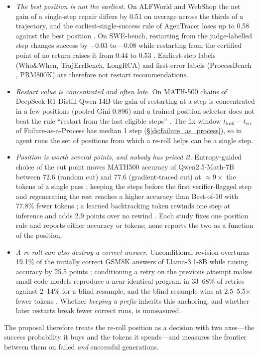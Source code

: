 \begin{itemize}[leftmargin=1.1em]
\item \emph{The best position is not the earliest.} On ALFWorld and WebShop the net gain of a single-step repair differs by 0.51 on average across the thirds of a trajectory, and the earliest-single-success rule of AgenTracer loses up to 0.58 against the best position \cite{liao2026repairs}. On SWE-bench, restarting from the judge-labelled step changes success by $-0.03$ to $-0.08$ while restarting from the certified point of no return raises it from 0.44 to 0.53 \cite{shen2026epv}. Earliest-step labels (Who\&When, TrajErrBench, LongRCA) and first-error labels (ProcessBench \cite{zheng2024processbench}, PRM800K) are therefore not restart recommendations.
\item \emph{Restart value is concentrated and often late.} On MATH-500 chains of DeepSeek-R1-Distill-Qwen-14B the gain of restarting at a step is concentrated in a few positions (pooled Gini 0.896) and a trained position selector does not beat the rule ``restart from the last eligible steps'' \cite{atri2026expanding}. The fix window $t_{\mathrm{lock}}-t_{\mathrm{err}}$ of Failure-as-a-Process has median 1 step (\S\ref{ds:failure_as_process}), so in agent runs the set of positions from which a re-roll helps can be a single step.
\item \emph{Position is worth several points, and nobody has priced it.} Entropy-guided choice of the cut point moves MATH500 accuracy of Qwen2.5-Math-7B between 72.6 (random cut) and 77.6 (gradient-traced cut) at $\approx9\times$ the tokens of a single pass \cite{ding2026rewind}; keeping the steps before the first verifier-flagged step and regenerating the rest reaches a higher accuracy than Best-of-10 with 77.8\% fewer tokens \cite{wu2024stepco}; a learned backtracking token rewinds one step at inference and adds 2.9 points over no rewind \cite{yang2025selfbacktrack}. Each study fixes one position rule and reports either accuracy or tokens; none reports the two as a function of the position.
\item \emph{A re-roll can also destroy a correct answer.} Unconditional revision overturns 19.1\% of the initially correct GSM8K answers of Llama-3.1-8B while raising accuracy by 25.5 points \cite{zhang2026riskaware}; conditioning a retry on the previous attempt makes small code models reproduce a near-identical program in 33--68\% of retries against 2--14\% for a blind resample, and the blind resample wins at 2.5--5.5$\times$ fewer tokens \cite{verma2026tryagain}. Whether \emph{keeping a prefix} inherits this anchoring, and whether later restarts break fewer correct runs, is unmeasured.
\end{itemize}
The proposal therefore treats the re-roll position as a decision with two axes---the success probability it buys and the tokens it spends---and measures the frontier between them on failed \emph{and} successful generations.

